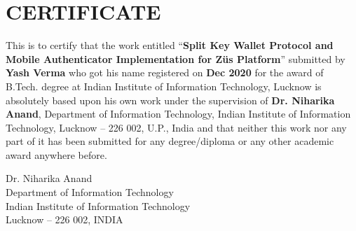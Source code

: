 \chapter*{CERTIFICATE}
This is to certify that the work entitled ``\textbf{Split Key Wallet Protocol and Mobile Authenticator Implementation for Züs Platform}'' submitted by \textbf{Yash Verma} who got his name registered on \textbf{Dec 2020} for the award of B.Tech. degree at Indian Institute of Information Technology, Lucknow is absolutely based upon his own work under the supervision of \textbf{Dr. Niharika Anand}, Department of Information Technology, Indian Institute of Information Technology, Lucknow -- 226 002, U.P., India and that neither this work nor any part of it has been submitted for any degree/diploma or any other academic award anywhere before.
\vspace{4cm}
\begin{center}
Dr. Niharika Anand\\
Department of Information Technology\\
Indian Institute of Information Technology\\
Lucknow -- 226 002, INDIA
\end{center}

